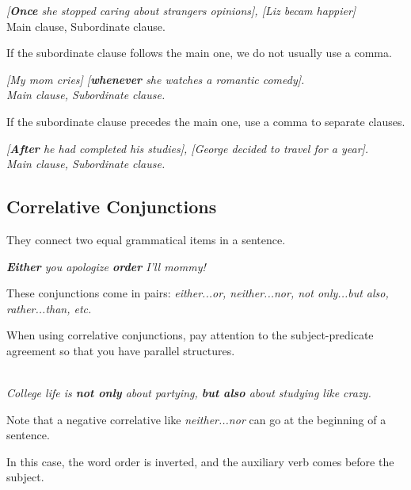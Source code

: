 \documentclass[hidelinks,10pt,a4paper]{article}
\begin{document}
\begin{center}
	\textit{[\textbf{Once} she stopped caring about strangers opinions], [Liz becam happier]}\\
	Main clause, Subordinate clause.
\end{center}

If the subordinate clause follows the main one, we do not usually use a comma.

\begin{center}
	\textit{[My mom cries] [\textbf{whenever} she watches a romantic comedy].\\
	Main clause, Subordinate clause.}
\end{center}

If the subordinate clause precedes the main one, use a comma to separate clauses.

\begin{center}
	\textit{[\textbf{After} he had completed his studies], [George decided to travel for a year].\\
	Main clause, Subordinate clause.}
\end{center}

\subsection{Correlative Conjunctions}
They connect two equal grammatical items in a sentence.

\begin{center}
	\textit{\textbf{Either} you apologize \textbf{order} I'll mommy!}
\end{center}

These conjunctions come in pairs: \textit{either...or, neither...nor, not only...but also, rather...than, etc.}

When using correlative conjunctions, pay attention to the subject-predicate agreement so that you have parallel structures.

\begin{center}
	\textit{\\
	College life is \textbf{not only} about partying, \textbf{but also} about studying like crazy.}
\end{center}

Note that a negative correlative like \textit{neither...nor} can go at the beginning of a sentence.

In this case, the word order is inverted, and the auxiliary verb comes before the subject.
\end{document}
